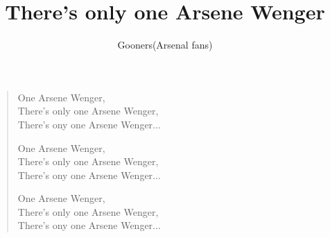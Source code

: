 \documentclass[a4paper,12pt]{article}
\title{There's only one Arsene Wenger}
\author{Gooners(Arsenal fans)}
\date{}
\begin{document}
	
	\maketitle
	
	\begin{verse}
		
		One Arsene Wenger, \\
		There's only one Arsene Wenger, \\
		There's ony one Arsene Wenger$\ldots$\par		
		One Arsene Wenger, \\
		There's only one Arsene Wenger, \\
		There's ony one Arsene Wenger$\ldots$\par 		
		One Arsene Wenger, \\
		There's only one Arsene Wenger, \\
		There's ony one Arsene Wenger$\ldots$
		
	\end{verse}
	
\end{document}
